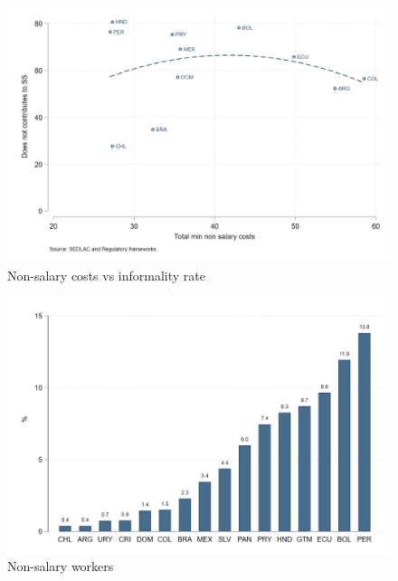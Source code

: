 \documentclass[english]{article}
\begin{document}
 \begin{figure}[H]
        \justifying
        \caption{Non-salary costs vs informality rate}     
       \centerline{\includegraphics[scale=.3]{latex/figures/Snapshot/Non_salary_costs_total_min.png}}
        \label{fig:Nonsalarycosts}
       
 \end{figure}

 \begin{figure}[H]
        \justifying
        \caption{Non-salary workers}     
       \centerline{\includegraphics[scale=.3]{latex/figures/Snapshot/Non_salary_share.png}}
        \label{fig:Nonsalarycosts}
       
 \end{figure}
\end{document}
